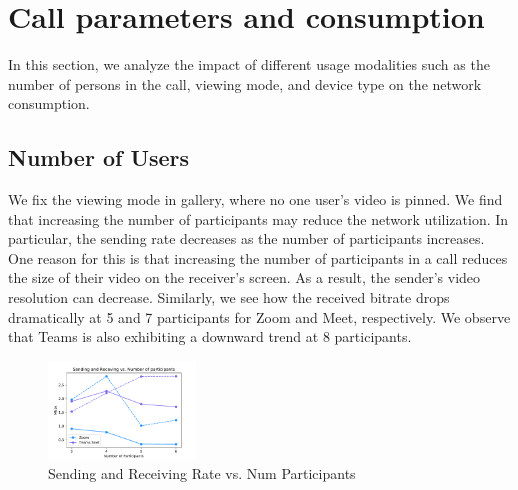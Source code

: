 \section{Call parameters and consumption}\label{sec:usage_modality}
In this section, we analyze the impact of different usage modalities such as the number of persons in the call, viewing mode, and device type on the network consumption. 
\subsection{Number of Users}
We fix the viewing mode in gallery, where no one user's video is pinned. We find that increasing the number of participants may reduce the network utilization. In particular, the sending rate decreases as the number of participants increases. One reason for this is that increasing the number of participants in a call reduces the size of their video on the receiver's screen. As a result, the sender's video resolution can decrease. Similarly, we see how the received bitrate drops dramatically at 5 and 7 participants for Zoom and Meet, respectively. We observe that Teams is also exhibiting a downward trend at 8 participants. 
\begin{figure}[]
    \includegraphics[width=0.35\textwidth,keepaspectratio]{../figures/modality/sending_call.pdf}
    \caption{Sending and Receiving Rate vs. Num Participants}
    \label{fig:loss_latency}
\end{figure}

